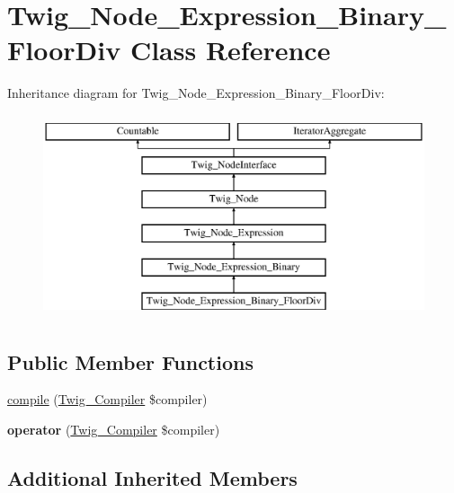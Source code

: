 \hypertarget{classTwig__Node__Expression__Binary__FloorDiv}{}\section{Twig\+\_\+\+Node\+\_\+\+Expression\+\_\+\+Binary\+\_\+\+Floor\+Div Class Reference}
\label{classTwig__Node__Expression__Binary__FloorDiv}
Inheritance diagram for Twig\+\_\+\+Node\+\_\+\+Expression\+\_\+\+Binary\+\_\+\+Floor\+Div\+:\begin{figure}[H]
\begin{center}
\leavevmode
\includegraphics[height=6.000000cm]{classTwig__Node__Expression__Binary__FloorDiv}
\end{center}
\end{figure}
\subsection*{Public Member Functions}
\begin{DoxyCompactItemize}
\item 
\hyperlink{classTwig__Node__Expression__Binary__FloorDiv_aa40334a273d71856900f5893938c6e9e}{compile} (\hyperlink{classTwig__Compiler}{Twig\+\_\+\+Compiler} \$compiler)
\item 
{\bfseries operator} (\hyperlink{classTwig__Compiler}{Twig\+\_\+\+Compiler} \$compiler)\hypertarget{classTwig__Node__Expression__Binary__FloorDiv_af7dc3d20d8a876b119dcd8f040953304}{}\label{classTwig__Node__Expression__Binary__FloorDiv_af7dc3d20d8a876b119dcd8f040953304}

\end{DoxyCompactItemize}
\subsection*{Additional Inherited Members}


